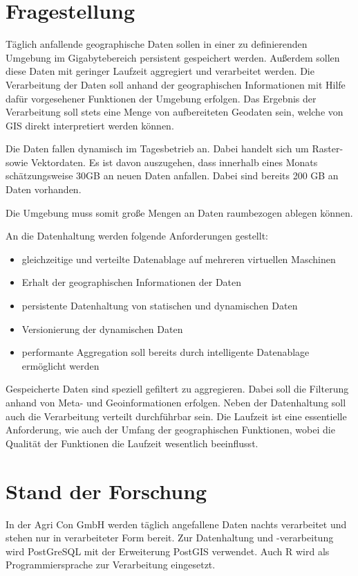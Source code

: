 \documentclass[
a4paper,     %
12pt         %
]{scrartcl}  %
\begin{document}
\section{Fragestellung}

Täglich anfallende geographische Daten sollen in einer zu definierenden Umgebung im Gigabytebereich persistent gespeichert werden.
Außerdem sollen diese Daten mit geringer Laufzeit aggregiert und verarbeitet werden.
Die Verarbeitung der Daten soll anhand der geographischen Informationen mit Hilfe dafür vorgesehener Funktionen der Umgebung erfolgen.
Das Ergebnis der Verarbeitung soll stets eine Menge von aufbereiteten Geodaten sein, welche von GIS direkt interpretiert werden können.

Die Daten fallen dynamisch im Tagesbetrieb an.
Dabei handelt sich um Raster- sowie Vektordaten.
Es ist davon auszugehen, dass innerhalb eines Monats schätzungsweise 30GB an neuen Daten anfallen.
Dabei sind bereits 200 GB an Daten vorhanden.

Die Umgebung muss somit große Mengen an Daten raumbezogen ablegen können.

An die Datenhaltung werden folgende Anforderungen gestellt:
\begin{itemize}
\item gleichzeitige und verteilte Datenablage auf mehreren virtuellen Maschinen
\item Erhalt der geographischen Informationen der Daten
\item persistente Datenhaltung von statischen und dynamischen Daten
\item Versionierung der dynamischen Daten
\item performante Aggregation soll bereits durch intelligente Datenablage ermöglicht werden
\end{itemize}

Gespeicherte Daten sind speziell gefiltert zu aggregieren.
Dabei soll die Filterung anhand von Meta- und Geoinformationen erfolgen.
Neben der Datenhaltung soll auch die Verarbeitung verteilt durchführbar sein.
Die Laufzeit ist eine essentielle Anforderung, wie auch der Umfang der geographischen Funktionen, wobei die Qualität der Funktionen die Laufzeit wesentlich beeinflusst.



\section{Stand der Forschung}

In der Agri Con GmbH werden täglich angefallene Daten nachts verarbeitet und stehen nur in verarbeiteter Form bereit.
Zur Datenhaltung und -verarbeitung wird PostGreSQL mit der Erweiterung PostGIS verwendet. Auch R wird als Programmiersprache zur Verarbeitung eingesetzt.
\end{document}
